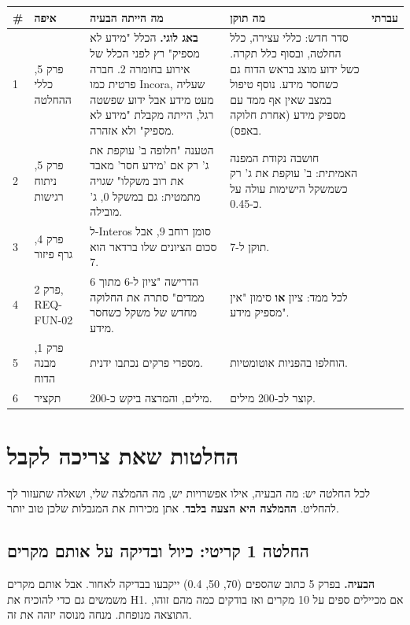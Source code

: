 \documentclass[11pt,a4paper]{article}
\newcommand{\en}[1]{\foreignlanguage{english}{#1}}
\newcommand{\cb}{\framebox[1.7ex]{\rule{0pt}{1.3ex}}}
\newcommand{\crit}{\textcolor{red!70!black}{\textbf{קריטי}}}
\begin{document}
{\small
\begin{longtable}{|p{0.5cm}|>{\raggedright\arraybackslash}p{2.2cm}|>{\raggedright\arraybackslash}p{5.6cm}|>{\raggedright\arraybackslash}p{5.3cm}|>{\centering\arraybackslash}p{1cm}|}
\hline
\textbf{\#} & \textbf{איפה} & \textbf{מה הייתה הבעיה} & \textbf{מה תוקן} & \textbf{עברתי} \\ \hline
\endhead
1 & פרק 5, כללי ההחלטה & \textbf{באג לוגי.} הכלל "מידע לא מספיק" רץ לפני הכלל של אירוע בחומרה 2. חברה פרטית כמו \en{Incora}, שעליה מעט מידע אבל ידוע שפשטה רגל, הייתה מקבלת "מידע לא מספיק" ולא אזהרה. & סדר חדש: כללי עצירה, כלל החלטה, ובסוף כלל תקרה. כשל ידוע מוצג בראש הדוח גם כשחסר מידע. נוסף טיפול במצב שאין אף ממד עם מספיק מידע (אחרת חלוקה באפס). & \cb \\ \hline
2 & פרק 5, ניתוח רגישות & הטענה "חלופה ב' עוקפת את ג' רק אם 'מידע חסר' מאבד את רוב משקלו" שגויה מתמטית: גם במשקל 0, ג' מובילה. & חושבה נקודת המפנה האמיתית: ב' עוקפת את ג' רק כשמשקל הישימות עולה על כ-0.45. & \cb \\ \hline
3 & פרק 4, גרף פיזור & ל-\en{Interos} סומן רוחב 9, אבל סכום הציונים שלו ברדאר הוא 7. & תוקן ל-7. & \cb \\ \hline
4 & פרק 2, \en{REQ-FUN-02} & הדרישה "ציון ל-6 מתוך 6 ממדים" סתרה את החלוקה מחדש של משקל כשחסר מידע. & לכל ממד: ציון \textbf{או} סימון "אין מספיק מידע". & \cb \\ \hline
5 & פרק 1, מבנה הדוח & מספרי פרקים נכתבו ידנית. & הוחלפו בהפניות אוטומטיות. & \cb \\ \hline
6 & תקציר & 276 מילים, והמרצה ביקש כ-200. & קוצר לכ-200 מילים. & \cb \\ \hline
\end{longtable}
}

\section{החלטות שאת צריכה לקבל}
לכל החלטה יש: מה הבעיה, אילו אפשרויות יש, מה ההמלצה שלי, ושאלה שתעזור לך להחליט. \textbf{ההמלצה היא הצעה בלבד}. אתן מכירות את המגבלות שלכן טוב יותר.

\subsection*{החלטה 1 \crit: כיול ובדיקה על אותם מקרים}
\textbf{הבעיה.} בפרק 5 כתוב שהספים (70, 50, 0.4) ייקבעו בבדיקה לאחור. אבל אותם מקרים משמשים גם כדי להוכיח את \en{H1}. אם מכיילים ספים על 10 מקרים ואז בודקים כמה מהם זוהו, התוצאה מנופחת. מנחה מנוסה יזהה את זה.
\end{document}
